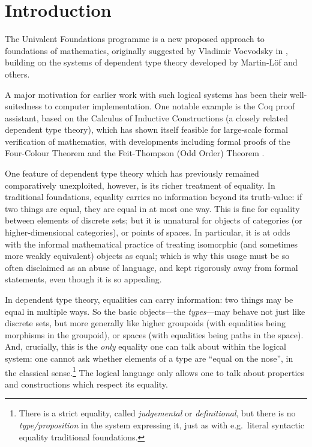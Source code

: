 \section*{Introduction}

The Univalent Foundations programme is a new proposed approach to foundations of mathematics, originally suggested by Vladimir Voevodsky in \cite{voevodsky:homotopy-lambda-calculus}, building on the systems of dependent type theory developed by Martin-Löf and others.

A major motivation for earlier work with such logical systems has been their well-suitedness to computer implementation.  One notable example is the Coq proof assistant, based on the Calculus of Inductive Constructions (a closely related dependent type theory), which has shown itself feasible for large-scale formal verification of mathematics, with developments including formal proofs of the Four-Colour Theorem \cite{gonthier:four-color} and the Feit-Thompson (Odd Order) Theorem \cite{gonthier:feit-thompson}.

One feature of dependent type theory which has previously remained comparatively unexploited, however, is its richer treatment of equality.  In traditional foundations, equality carries no information beyond its truth-value: if two things are equal, they are equal in at most one way.  This is fine for equality between elements of discrete sets; but it is unnatural for objects of categories (or higher-dimensional categories), or points of spaces.  In particular, it is at odds with the informal mathematical practice of treating isomorphic (and sometimes more weakly equivalent) objects as equal; which is why this usage must be so often disclaimed as an abuse of language, and kept rigorously away from formal statements, even though it is so appealing.

In dependent type theory, equalities can carry information: two things may be equal in multiple ways.  So the basic objects—the \emph{types}—may behave not just like discrete sets, but more generally like higher groupoids (with equalities being morphisms in the groupoid), or spaces (with equalities being paths in the space).  And, crucially, this is the \emph{only} equality one can talk about within the logical system: one cannot ask whether elements of a type are “equal on the nose”, in the classical sense.\footnote{There is a strict equality, called \emph{judgemental} or \emph{definitional}, but there is no \emph{type/proposition} in the system expressing it, just as with e.g.\ literal syntactic equality traditional foundations.}  The logical language only allows one to talk about properties and constructions which respect its equality.

